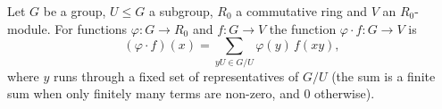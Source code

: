 Let $G$ be a group, $U\le G$ a subgroup, $R_0$ a commutative ring and $V$ an $R_0$-module. For functions $\varphi\colon G\to R_0$ and
$f\colon G\to V$ the function $\varphi\cdot f\colon G\to V$ is
\[
  (\varphi\cdot f)(x)=\sum_{yU\in G/U}\varphi(y)\,f(xy),
\]
where $y$ runs through a fixed set of representatives of $G/U$ (the sum is a finite sum when only finitely many terms are non-zero,
and $0$ otherwise).
